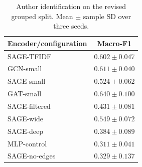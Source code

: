 \begin{table}[t]
\centering
\footnotesize
\caption{Author identification on the revised grouped split. Mean $\pm$ sample SD over three seeds.}
\label{tab:author-v2}
\setlength{\tabcolsep}{4pt}
\begin{tabular}{lc}
\toprule
Encoder/configuration & Macro-F1 \\
\midrule
SAGE-TFIDF & $0.602\pm0.047$ \\
GCN-small & $0.611\pm0.040$ \\
SAGE-small & $0.524\pm0.062$ \\
GAT-small & $0.640\pm0.100$ \\
SAGE-filtered & $0.431\pm0.081$ \\
SAGE-wide & $0.549\pm0.072$ \\
SAGE-deep & $0.384\pm0.089$ \\
MLP-control & $0.311\pm0.041$ \\
SAGE-no-edges & $0.329\pm0.137$ \\
\bottomrule
\end{tabular}
\end{table}
